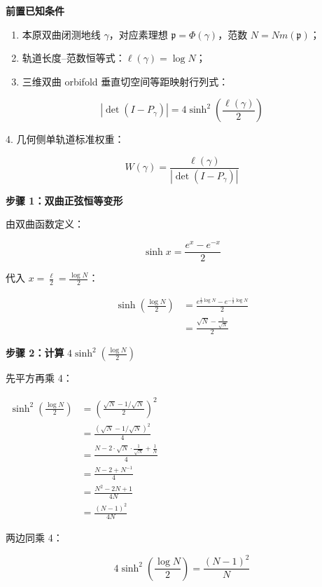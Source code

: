 \documentclass[11pt,a4paper]{ctexart}
\begin{document}
\textbf{前置已知条件}

\begin{enumerate}
\def\labelenumi{\arabic{enumi}.}
\item
  本原双曲闭测地线 \(\gamma\)，对应素理想
  \(\mathfrak{p} = \Phi(\gamma)\)，范数
  \(N = Nm\left( \mathfrak{p} \right)\)；
\item
  轨道长度--范数恒等式：\(\ell\left(\gamma\right) = \log N\)；
\item
  三维双曲 orbifold 垂直切空间等距映射行列式：
\end{enumerate}

\[\left| \det\left( I - P_{\gamma} \right) \right| = 4\sinh^{2}\left( \frac{\ell\left(\gamma\right)}{2} \right)\]

4. 几何侧单轨道标准权重：

\[W(\gamma) = \frac{\ell\left(\gamma\right)}{\left| \det\left( I - P_{\gamma} \right) \right|}\]

\textbf{步骤 1：双曲正弦恒等变形}

由双曲函数定义：

\[\sinh x = \frac{e^{x} - e^{- x}}{2}\]

代入 \(x = \frac{\ell}{2} = \frac{\log N}{2}\)：

\[\begin{aligned}
\sinh\left( \frac{\log N}{2} \right) & = \frac{e^{\frac{1}{2}\log N} - e^{- \frac{1}{2}\log N}}{2} \\
& = \frac{\sqrt{N} - \frac{1}{\sqrt{N}}}{2}
\end{aligned}\]

\textbf{步骤 2：计算} \(4\sinh^{2}\left( \frac{\log N}{2} \right)\)

先平方再乘 4：

\(\begin{aligned}
\sinh^{2}\left( \frac{\log N}{2} \right) & = \left( \frac{\sqrt{N} - 1/\sqrt{N}}{2} \right)^{2} \\
& = \frac{\left( \sqrt{N} - 1/\sqrt{N} \right)^{2}}{4} \\
& = \frac{N - 2 \cdot \sqrt{N} \cdot \frac{1}{\sqrt{N}} + \frac{1}{N}}{4} \\
& = \frac{N - 2 + N^{- 1}}{4} \\
& = \frac{N^{2} - 2N + 1}{4N} \\
& = \frac{(N - 1)^{2}}{4N}
\end{aligned}\)

两边同乘 4：

\[4\sinh^{2}\left( \frac{\log N}{2} \right) = \frac{(N - 1)^{2}}{N}\]
\end{document}
